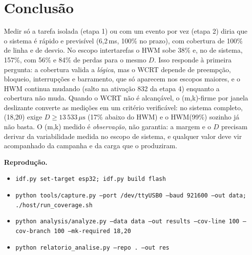 \documentclass[11pt,a4paper]{article}
\newcommand{\us}{\ensuremath{\,\mu\mathrm{s}}}
\begin{document}
\section{Conclusão}
Medir só a tarefa isolada (etapa 1) ou com um evento por vez (etapa 2) diria que o sistema é rápido e previsível (6,2\,ms, 100\% no prazo), com cobertura de 100\% de linha e de desvio. No escopo intertarefas o HWM sobe 38\% e, no de sistema, 157\%, com 56\% e 84\% de perdas para o mesmo $D$. Isso responde à primeira pergunta: a cobertura valida a \emph{lógica}, mas o WCRT depende de preempção, bloqueio, interrupções e barramento, que só aparecem nos escopos maiores, e o HWM continua mudando (salto na ativação 832 da etapa 4) enquanto a cobertura não muda. Quando o WCRT não é alcançável, o (m,k)-firme por janela deslizante converte as medições em um critério verificável: no sistema completo, (18,20) exige $D\ge13\,533\us$ (17\% abaixo do HWM) e o HWM(99\%) sozinho já não basta. O (m,k) medido é \emph{observação}, não garantia: a margem e o $D$ precisam derivar da variabilidade medida no escopo de sistema, e qualquer valor deve vir acompanhado da campanha e da carga que o produziram.

\noindent\textbf{Reprodução.}
\begin{itemize}\footnotesize
\item \texttt{idf.py set-target esp32; idf.py build flash}
\item \texttt{python tools/capture.py --port /dev/ttyUSB0 --baud 921600 --out data; ./host/run\_coverage.sh}
\item \texttt{python analysis/analyze.py --data data --out results --cov-line 100 --cov-branch 100 --mk-required 18,20}
\item \texttt{python relatorio\_analise.py --repo . --out res}
\end{itemize}
\end{document}
